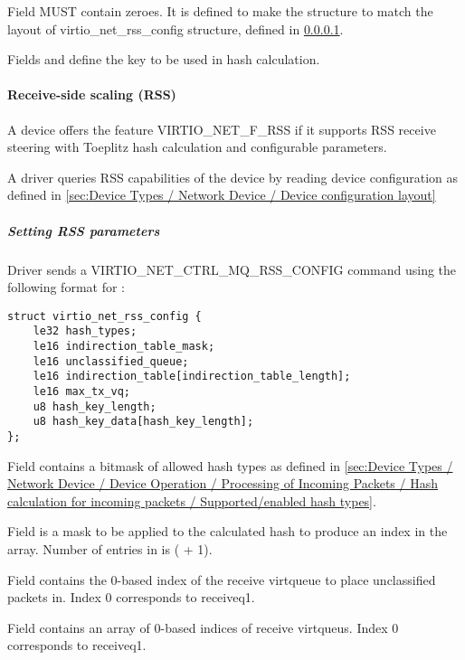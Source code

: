 Field  MUST contain zeroes. It is defined to make the structure to match the layout of virtio_net_rss_config structure,
defined in \ref{sec:Device Types / Network Device / Device Operation / Control Virtqueue / Receive-side scaling (RSS)}.

Fields  and  define the key to be used in hash calculation.

\paragraph{Receive-side scaling (RSS)}\label{sec:Device Types / Network Device / Device Operation / Control Virtqueue / Receive-side scaling (RSS)}
A device offers the feature VIRTIO_NET_F_RSS if it supports RSS receive steering with Toeplitz hash calculation and configurable parameters.

A driver queries RSS capabilities of the device by reading device configuration as defined in \ref{sec:Device Types / Network Device / Device configuration layout}

\subparagraph{Setting RSS parameters}\label{sec:Device Types / Network Device / Device Operation / Control Virtqueue / Receive-side scaling (RSS) / Setting RSS parameters}

Driver sends a VIRTIO_NET_CTRL_MQ_RSS_CONFIG command using the following format for :
\begin{lstlisting}
struct virtio_net_rss_config {
    le32 hash_types;
    le16 indirection_table_mask;
    le16 unclassified_queue;
    le16 indirection_table[indirection_table_length];
    le16 max_tx_vq;
    u8 hash_key_length;
    u8 hash_key_data[hash_key_length];
};
\end{lstlisting}
Field  contains a bitmask of allowed hash types as
defined in
\ref{sec:Device Types / Network Device / Device Operation / Processing of Incoming Packets / Hash calculation for incoming packets / Supported/enabled hash types}.

Field  is a mask to be applied to
the calculated hash to produce an index in the
 array.
Number of entries in  is ( + 1).

Field  contains the 0-based index of
the receive virtqueue to place unclassified packets in. Index 0 corresponds to receiveq1.

Field  contains an array of 0-based indices of receive virtqueus. Index 0 corresponds to receiveq1.

